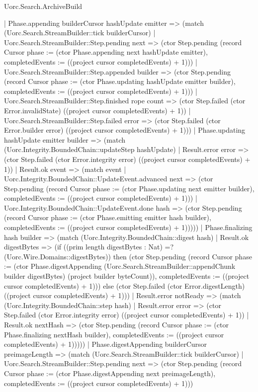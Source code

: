 \begin{lexlean}{Uorc.Search.ArchiveBuild}
\begin{semanticmodule}
{    | Phase.appending builderCursor hashUpdate emitter => (match (Uorc.Search.StreamBuilder::tick builderCursor)
      | Uorc.Search.StreamBuilder::Step.pending next => (ctor Step.pending (record Cursor {phase := (ctor Phase.appending next hashUpdate emitter), completedEvents := ((project cursor completedEvents) + 1)}))
      | Uorc.Search.StreamBuilder::Step.appended builder => (ctor Step.pending (record Cursor {phase := (ctor Phase.updating hashUpdate emitter builder), completedEvents := ((project cursor completedEvents) + 1)}))
      | Uorc.Search.StreamBuilder::Step.finished rope count => (ctor Step.failed (ctor Error.invalidState) ((project cursor completedEvents) + 1))
      | Uorc.Search.StreamBuilder::Step.failed error => (ctor Step.failed (ctor Error.builder error) ((project cursor completedEvents) + 1)))
    | Phase.updating hashUpdate emitter builder => (match (Uorc.Integrity.BoundedChain::updateStep hashUpdate)
      | Result.error error => (ctor Step.failed (ctor Error.integrity error) ((project cursor completedEvents) + 1))
      | Result.ok event => (match event
        | Uorc.Integrity.BoundedChain::UpdateEvent.advanced next => (ctor Step.pending (record Cursor {phase := (ctor Phase.updating next emitter builder), completedEvents := ((project cursor completedEvents) + 1)}))
        | Uorc.Integrity.BoundedChain::UpdateEvent.done hash => (ctor Step.pending (record Cursor {phase := (ctor Phase.emitting emitter hash builder), completedEvents := ((project cursor completedEvents) + 1)}))))
    | Phase.finalizing hash builder => (match (Uorc.Integrity.BoundedChain::digest hash)
      | Result.ok digestBytes => (if ((prim length digestBytes : Nat) =? (Uorc.Wire.Domains::digestBytes)) then (ctor Step.pending (record Cursor {phase := (ctor Phase.digestAppending (Uorc.Search.StreamBuilder::appendChunk builder digestBytes) (project builder byteCount)), completedEvents := ((project cursor completedEvents) + 1)})) else (ctor Step.failed (ctor Error.digestLength) ((project cursor completedEvents) + 1)))
      | Result.error notReady => (match (Uorc.Integrity.BoundedChain::step hash)
        | Result.error error => (ctor Step.failed (ctor Error.integrity error) ((project cursor completedEvents) + 1))
        | Result.ok nextHash => (ctor Step.pending (record Cursor {phase := (ctor Phase.finalizing nextHash builder), completedEvents := ((project cursor completedEvents) + 1)}))))
    | Phase.digestAppending builderCursor preimageLength => (match (Uorc.Search.StreamBuilder::tick builderCursor)
      | Uorc.Search.StreamBuilder::Step.pending next => (ctor Step.pending (record Cursor {phase := (ctor Phase.digestAppending next preimageLength), completedEvents := ((project cursor completedEvents) + 1)}))
}
\end{semanticmodule}
\end{lexlean}
